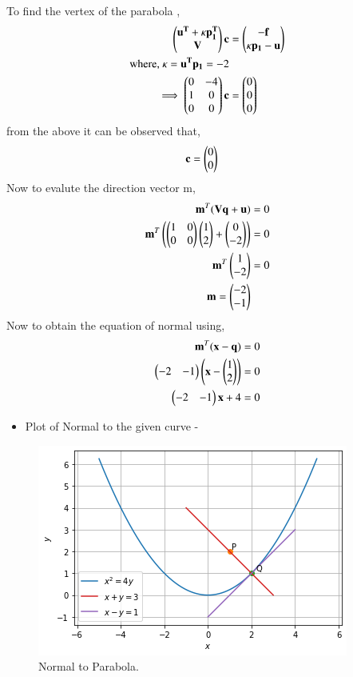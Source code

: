 \documentclass[journal,12pt,twocolumn]{IEEEtran}
\begin{document}
To find the vertex of the parabola ,
\begin{align} \begin{pmatrix}\mathbf{u^T}+\kappa\mathbf{p_1^T}\\\mathbf{V} \end{pmatrix}\mathbf{c} &= \begin{pmatrix}\mathbf{-f}\\\kappa \mathbf{p_1} -\mathbf{u}\end{pmatrix}
\\
\text{where, }  \kappa = \mathbf{u^T}\mathbf{p_1} = -2
\\
\implies\begin{pmatrix}0 & -4\\1 & 0 \\0 & 0\end{pmatrix} \mathbf{c}&= \begin{pmatrix}0\\0\\0\end{pmatrix} \label{eq:b}
\end{align}
from the above it can be observed that,
\begin{align}    
   \mathbf{c} &= \begin{pmatrix}0 \\ 0\end{pmatrix}
\end{align}
Now to evalute the direction vector m,
\begin{align}
\mathbf{m}^T(\mathbf{V}\mathbf{q} + \mathbf{u}) &=0
\\
\mathbf{m}^T\left(\begin{pmatrix}1 & 0 \\ 0 & 0\end{pmatrix}\begin{pmatrix}1 \\ 2\end{pmatrix} + \begin{pmatrix}0 \\ -2\end{pmatrix}\right) &=0
\\
\mathbf{m}^T\begin{pmatrix}1 \\ -2\end{pmatrix} &=0
\\
\mathbf{m} = \begin{pmatrix}-2 \\ -1\end{pmatrix}
\end{align}
Now to obtain the equation of normal using,
\begin{align}
\mathbf{m}^T(\mathbf{x} - \mathbf{q}) &=0 
\\
\begin{pmatrix}-2 & -1\end{pmatrix}\left(\mathbf{x}-\begin{pmatrix}1 \\ 2\end{pmatrix}\right) &= 0
\\
\begin{pmatrix}-2 & -1\end{pmatrix}\mathbf{x}+ 4 &= 0 
\end{align}
\begin{itemize}
\item Plot of Normal to the given curve -
\end{itemize}
\begin{figure}[ht]
    \centering
    \includegraphics[width=\columnwidth]{FIGURE4.png}
    \caption{Normal to Parabola.}
    \label{fig:Normal to parabola.}
\end{figure}    
\end{document}
